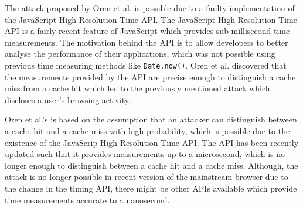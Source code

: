 \documentclass[10pt,a4paper,twoside]{book}
\begin{document}
The attack proposed by Oren et al.\cite{oren2015spy} is possible due to a faulty implementation of the JavaScript High Resolution Time API\cite{jshighresolutiontimeapi}. The JavaScript High Resolution Time API is a fairly recent feature of JavaScript which provides sub millisecond time measurements. The motivation behind the API is to allow developers to better analyse the performance of their applications, which was not possible using previous time measuring methods like \texttt{Date.now()}\cite{datenow}. Oren et al.\cite{oren2015spy} discovered that the measurements provided by the API are precise enough to distinguish a cache miss from a cache hit which led to the previously mentioned attack which discloses a user's browsing activity.

Oren et al.'s \cite{oren2015spy} is based on the assumption that an attacker can distinguish between a cache hit and a cache miss with high probability, which is possible due to the existence of the JavaScrip High Resolution Time API. The API has been recently updated such that it provides measurements up to a microsecond, which is no longer enough to distinguish between a cache hit and a cache miss. Although, the attack is no longer possible in recent version of the mainstream browser due to the change in the timing API, there might be other APIs available which provide time measurements accurate to a nanosecond.
\end{document}
